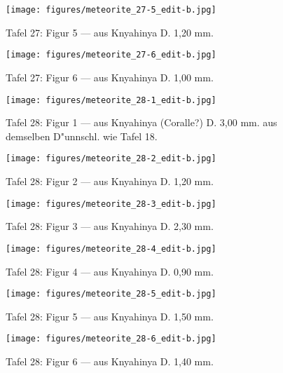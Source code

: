 \documentclass[a4paper, 11pt, oneside]{article}
\begin{document}
\clearpage
\begin{figure}[t]
\texttt{[image: figures/meteorite\_27-5\_edit-b.jpg]}
\caption{Tafel 27: Figur 5 --- aus Knyahinya D. 1,20 mm.}
\centering
\end{figure}
\clearpage
\begin{figure}[t]
\texttt{[image: figures/meteorite\_27-6\_edit-b.jpg]}
\caption{Tafel 27: Figur 6 --- aus Knyahinya D. 1,00 mm.}
\centering
\end{figure}
\clearpage
{}
\begin{figure}[t]
\texttt{[image: figures/meteorite\_28-1\_edit-b.jpg]}
\caption{Tafel 28: Figur 1 --- aus Knyahinya (Coralle?) D. 3,00 mm. aus demselben D"unnschl. wie Tafel 18.}
\centering
\end{figure}
\clearpage
\begin{figure}[t]
\texttt{[image: figures/meteorite\_28-2\_edit-b.jpg]}
\caption{Tafel 28: Figur 2 --- aus Knyahinya D. 1,20 mm.}
\centering
\end{figure}
\clearpage
\begin{figure}[t]
\texttt{[image: figures/meteorite\_28-3\_edit-b.jpg]}
\caption{Tafel 28: Figur 3 --- aus Knyahinya D. 2,30 mm.}
\centering
\end{figure}
\clearpage
\begin{figure}[t]
\texttt{[image: figures/meteorite\_28-4\_edit-b.jpg]}
\caption{Tafel 28: Figur 4 --- aus Knyahinya D. 0,90 mm.}
\centering
\end{figure}
\clearpage
\begin{figure}[t]
\texttt{[image: figures/meteorite\_28-5\_edit-b.jpg]}
\caption{Tafel 28: Figur 5 --- aus Knyahinya D. 1,50 mm.}
\centering
\end{figure}
\clearpage
\begin{figure}[t]
\texttt{[image: figures/meteorite\_28-6\_edit-b.jpg]}
\caption{Tafel 28: Figur 6 --- aus Knyahinya D. 1,40 mm.}
\centering
\end{figure}
\end{document}
